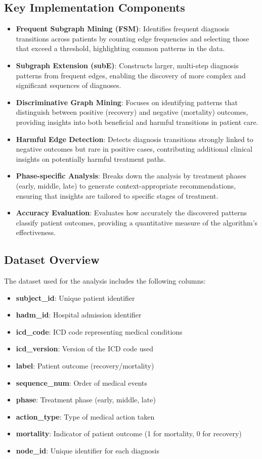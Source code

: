 \documentclass[11pt]{article}
\begin{document}
\subsection{Key Implementation Components}
\begin{itemize}
    \item \textbf{Frequent Subgraph Mining (FSM)}: Identifies frequent diagnosis transitions across patients by counting edge frequencies and selecting those that exceed a threshold, highlighting common patterns in the data.
    \item \textbf{Subgraph Extension (subE)}: Constructs larger, multi-step diagnosis patterns from frequent edges, enabling the discovery of more complex and significant sequences of diagnoses.
    \item \textbf{Discriminative Graph Mining}: Focuses on identifying patterns that distinguish between positive (recovery) and negative (mortality) outcomes, providing insights into both beneficial and harmful transitions in patient care.
    \item \textbf{Harmful Edge Detection}: Detects diagnosis transitions strongly linked to negative outcomes but rare in positive cases, contributing additional clinical insights on potentially harmful treatment paths.
    \item \textbf{Phase-specific Analysis}: Breaks down the analysis by treatment phases (early, middle, late) to generate context-appropriate recommendations, ensuring that insights are tailored to specific stages of treatment.
    \item \textbf{Accuracy Evaluation}: Evaluates how accurately the discovered patterns classify patient outcomes, providing a quantitative measure of the algorithm's effectiveness.
\end{itemize}


\subsection{Dataset Overview}
The dataset used for the analysis includes the following columns:
\begin{itemize}
    \item \textbf{subject\_id}: Unique patient identifier
    \item \textbf{hadm\_id}: Hospital admission identifier
    \item \textbf{icd\_code}: ICD code representing medical conditions
    \item \textbf{icd\_version}: Version of the ICD code used
    \item \textbf{label}: Patient outcome (recovery/mortality)
    \item \textbf{sequence\_num}: Order of medical events
    \item \textbf{phase}: Treatment phase (early, middle, late)
    \item \textbf{action\_type}: Type of medical action taken
    \item \textbf{mortality}: Indicator of patient outcome (1 for mortality, 0 for recovery)
    \item \textbf{node\_id}: Unique identifier for each diagnosis
\end{itemize}
\end{document}
